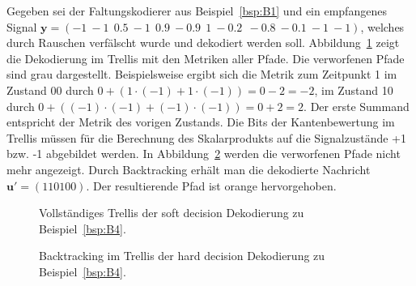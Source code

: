 \begin{beispiel}
Gegeben sei der Faltungskodierer aus Beispiel~\ref{bsp:B1} und ein empfangenes Signal $\mathbf{y}=\left( -1~-1~~0.5~-1~~0.9~-0.9~~1~-0.2~~-0.8~-0.1~-1~-1\right)$, welches durch Rauschen verfälscht wurde und dekodiert werden soll. Abbildung~\ref{abb:trellis_dek_soft_a} zeigt die Dekodierung im Trellis mit den Metriken aller Pfade. Die verworfenen Pfade sind grau dargestellt. Beispielsweise ergibt sich die Metrik zum Zeitpunkt 1 im Zustand 00 durch $0+\left( 1\cdot\left( -1\right) + 1\cdot\left( -1\right)\right) =0-2=-2$, im Zustand 10 durch $0+\left( \left( -1\right)\cdot\left( -1\right) + \left( -1\right)\cdot\left( -1\right)\right) =0+2=2$. Der erste Summand entspricht der Metrik des vorigen Zustands. Die Bits der Kantenbewertung im Trellis müssen für die Berechnung des Skalarprodukts auf die Signalzustände +1 bzw. -1 abgebildet werden. In Abbildung~\ref{abb:trellis_dek_soft_b} werden die verworfenen Pfade nicht mehr angezeigt. Durch Backtracking erhält man die dekodierte Nachricht $\mathbf{u'}=\left( 110100\right)$. Der resultierende Pfad ist orange hervorgehoben.
\label{bsp:B4}
\end{beispiel}

\begin{figure}[t]
	\centering
	\resizebox{0.75\textwidth}{!}{%
		
	}
	\caption{Vollständiges Trellis der soft decision Dekodierung zu Beispiel~\ref{bsp:B4}.}
	\label{abb:trellis_dek_soft_a}
\end{figure}
\begin{figure}[t]
	\centering
	\resizebox{0.75\textwidth}{!}{%
		
	}
	\caption{Backtracking im Trellis der hard decision Dekodierung zu Beispiel~\ref{bsp:B4}.}
	\label{abb:trellis_dek_soft_b}
\end{figure}

%				
%				

